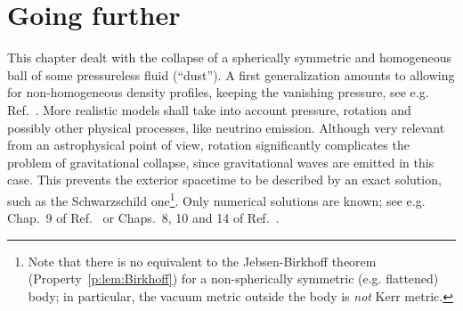 \section{Going further}

This chapter dealt with the collapse of a spherically symmetric and homogeneous ball of some
pressureless fluid (``dust'').
A first generalization amounts to allowing for non-homogeneous density profiles,
keeping the vanishing pressure, see e.g. Ref.~\cite{PlebaK06}.
More realistic models shall take into account pressure, rotation and possibly
other physical processes, like neutrino emission.
Although very relevant from an astrophysical point of view, rotation
significantly complicates the problem of gravitational collapse,
since gravitational waves are emitted in this case.
This prevents the exterior spacetime to be described by an exact solution,
such as the Schwarzschild one\footnote{Note that there is no equivalent to the
Jebsen-Birkhoff theorem
(Property~\ref{p:lem:Birkhoff}) for a non-spherically symmetric (e.g. flattened) body;
in particular, the vacuum metric
outside the body is \emph{not} Kerr metric.}. Only numerical solutions are known;
see e.g. Chap.~9 of Ref.~\cite{Shiba15} or Chaps.~8, 10 and 14 of Ref.~\cite{BaumgS10}.




